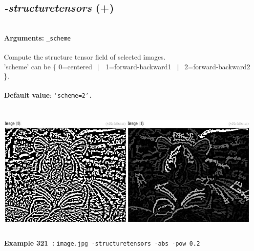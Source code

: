 \documentclass[a4paper,11pt,twoside]{book}
\begin{document}
\subsection{\emph{-structuretensors} (+)}\vspace*{-0.5em}
~\\\textbf{Arguments: } 
{\small \texttt{\_scheme}}\\~\\
Compute the structure tensor field of selected images.
~\\'scheme' can be \{ 0=centered ~$|$~ 1=forward-backward1 ~$|$~ 2=forward-backward2 \}.
~\\~\\\textbf{Default value}: {\small \texttt{'scheme=2'.}}
\begin{center}\includegraphics[keepaspectratio=true,height=7cm,width=\textwidth]{img/gmic_def321.jpg}\\
{\footnotesize \textbf{Example 321~:} \texttt{image.jpg -structuretensors -abs -pow 0.2}}
\end{center}
\end{document}
